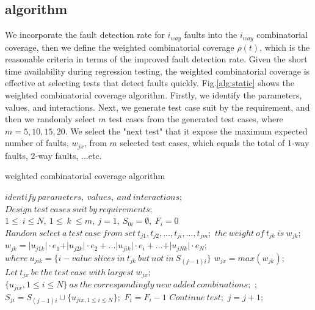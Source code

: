 \documentclass[10pt,conference, compsocconf]{IEEEtran}
\begin{document}
\begin{CJK}{UTF8}{gkai}
\subsection{algorithm}
We incorporate the fault detection rate for $i_{way}$ faults into the $i_{way}$ combinatorial coverage,
then we define the weighted combinatorial coverage $\rho(t)$, which is the reasonable criteria in terms
of the improved fault detection rate.
Given the short time availability during regression testing, 
the weighted combinatorial coverage is effective at selecting tests that detect faults quickly.
Fig.\ref{alg:static} shows the weighted combinatorial coverage algorithm.
Firstly, we identify the parameters, values, and interactions. 
Next, we generate test case suit by the requirement,
and then we randomly select $m$ test cases from the generated test cases, where $m=5,10,15,20$. 
We select the "next test" that it expose the maximum expected number of faults, $w_{jx}$,
from $m$ selected test cases,  
which equals the total of 1-{way} faults, 2-{way} faults, ...etc. 

\begin{algorithm*}
\caption{weighted combinatorial coverage  algorithm}
\label{alg:static}
\begin{algorithmic}[1]
 \State $identify\ parameters,\  values,\ and\ interactions;$
 \State $Design\ test\  cases\  suit\  by\  requirements;$
 \State $1\leq\ i \leq N,\  1\leq\  k\  \leq m,\ j=1,\  S_{0i}=\emptyset, \ F_i=0$
         \State $Random\ select\ a\  test\  case\  from\  set\  t_{j1}, t_{j2},...,t_{ji},...,t_{jm};$ 
         \State $the\  weight\  of\  t_{jk}\  is\  w_{jk};$
         \State $w_{jk}=\vert {u_{j1k}}\vert \cdot e_1+\vert {u_{j2k}}\vert \cdot e_2+...\vert {u_{jik}}\vert \cdot e_i+...+\vert {u_{jNk}}\vert \cdot e_N;$ 
         \State $where\  u_{jik}=\{i-value\  slices\  in\  t_{jk}\  but\  not\  in\  S_{(j-1)i}\}$ 
         \State $w_{jx}=max(w_{jk});$ 
         \State $Let\  t_{jx}\  be\  the\  test\  case\  with\  largest\  w_{jx};$ 
         \State $\{u_{jix}, 1\leq i \leq N\}\  as\  the\  correspondingly\  new\  added\  combinations;$ ;
         \State $S_{ji}=S_{(j-1)i} \cup \{u_{jix, 1\leq i \leq N}\};$ 
                  \State $F_{i}=F_{i}-1$ 
         \Else                  
                   \State $Continue\  test;$
          \EndIf               
          \State $j=j+1;$
      \EndWhile 
 \end{algorithmic}
 \end{algorithm*}


\end{CJK}
\end{document}

